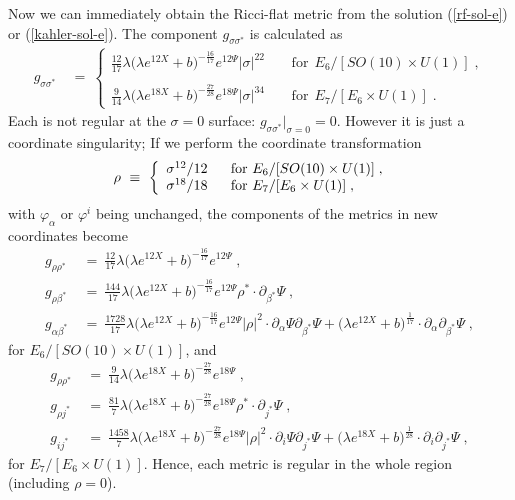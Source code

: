\documentclass[a4paper,11pt]{article}
\newcommand{\del}{\partial}
\newcommand{\ls}{\ \ \ \ \ }
\newcommand{\dps}{\displaystyle}
\begin{document}
{Now we can immediately obtain the Ricci-flat metric from 
the solution (\ref{rf-sol-e}) or (\ref{kahler-sol-e}).
The component $g_{\sigma \sigma^*}$ is calculated as
\begin{align}
g_{\sigma \sigma^*} \ &= \ \left\{
\begin{array}{ll}
\dps \frac{12}{17} \lambda 
\big( \lambda e^{12 X} + b \big)^{-\frac{16}{17}} 
e^{12 \Psi} |\sigma|^{22} 
& \dps \ls \mbox{for} \ \ E_6 / [SO(10) \times U(1)] \; , \\
\\
\dps \frac{9}{14} \lambda 
\big( \lambda e^{18 X} + b \big)^{-\frac{27}{28}} 
e^{18 \Psi} |\sigma|^{34} 
& \dps \ls \mbox{for} \ \ E_7 / [E_6 \times U(1)] \; . 
\end{array} \right.
\end{align}
Each is not regular at the $\sigma = 0$ surface: 
$g_{\sigma \sigma^*} |_{\sigma = 0} = 0$.
However it is just a coordinate singularity; 
If we perform the coordinate transformation
\begin{align}
\rho \ &\equiv \ \left\{
\begin{array}{l@{\ls}l}
\sigma^{12}/{12} & \mbox{for $E_6 / [SO(10) \times U(1)]$} \; , \\
\sigma^{18}/{18} & \mbox{for $E_7 / [E_6 \times U(1)]$} \; ,
\end{array} \right. 
\end{align}
with $\varphi_{\alpha}$ or $\varphi^i$ being unchanged, 
the components of the metrics in new coordinates become
\begin{align}
g_{\rho \rho^*} 
\ &= \ 
\frac{12}{17} \lambda 
\big( \lambda e^{12 X} + b \big)^{- \frac{16}{17}} e^{12 \Psi} \; ,
\nonumber \\
g_{\rho \beta^*} 
\ &= \ 
\frac{144}{17} \lambda 
\big( \lambda e^{12 X} + b \big)^{- \frac{16}{17}} 
e^{12 \Psi} \rho^* \cdot \del_{\beta^*} \Psi \; , \\
g_{\alpha \beta^*} 
\ &= \ 
\frac{1728}{17} \lambda 
\big( \lambda e^{12 X} + b \big)^{- \frac{16}{17}} 
e^{12 \Psi} |\rho|^2 \cdot \del_{\alpha} \Psi \del_{\beta^*} \Psi 
+ \big( \lambda e^{12 X} + b \big)^{\frac{1}{17}} 
\cdot \del_{\alpha} \del_{\beta^*} \Psi \; , 
\nonumber
\end{align}
for $E_6 / [ SO(10) \times U(1)]$, and
\begin{align}
g_{\rho \rho^*} 
\ &= \ 
\frac{9}{14} \lambda 
\big( \lambda e^{18 X} + b \big)^{- \frac{27}{28}} e^{18 \Psi} \; , 
\nonumber \\
g_{\rho j^*} 
\ &= \ 
\frac{81}{7} \lambda 
\big( \lambda e^{18 X} + b \big)^{- \frac{27}{28}} 
e^{18 \Psi} \rho^* \cdot \del_{j^*} \Psi \; , \\
g_{i j^*} 
\ &= \ 
\frac{1458}{7} \lambda 
\big( \lambda e^{18 X} + b \big)^{- \frac{27}{28}} 
e^{18 \Psi} |\rho|^2 \cdot \del_{i} \Psi \del_{j^*} \Psi 
+ \big( \lambda e^{18 X} + b \big)^{\frac{1}{28}} 
\cdot \del_{i} \del_{j^*} \Psi \; ,
\nonumber 
\end{align}
for $E_7 / [E_6 \times U(1)]$.
Hence, each metric is regular in the whole region (including $\rho = 0$).

}
\end{document}
